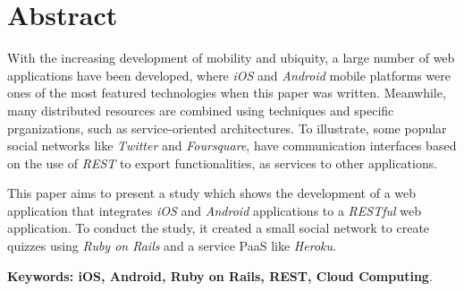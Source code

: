 \chapter*{Abstract}
\label{chp:abstract}%
\thispagestyle{empty}

\setcounter{footnote}{0}

With the increasing development of mobility and ubiquity, a large number of web applications have been developed, where \emph{iOS} and \emph{Android} mobile platforms were ones of the most featured technologies when this paper was written. Meanwhile, many distributed resources are combined using techniques and specific prganizations, such as service-oriented architectures. To illustrate, some popular social networks like \emph{Twitter} and \emph {Foursquare}, have communication interfaces based on the use of \emph{REST} to export functionalities, as services to other applications.

This paper aims to present a study which shows the development of a web application that integrates \emph{iOS} and \emph{Android} applications to a \emph{RESTful} web application. To conduct the study, it created a small social network to create quizzes using \emph{Ruby on Rails} and a service PaaS like \emph{Heroku}.

\noindent \textbf{Keywords: iOS, Android, Ruby on Rails, REST, Cloud Computing}.


